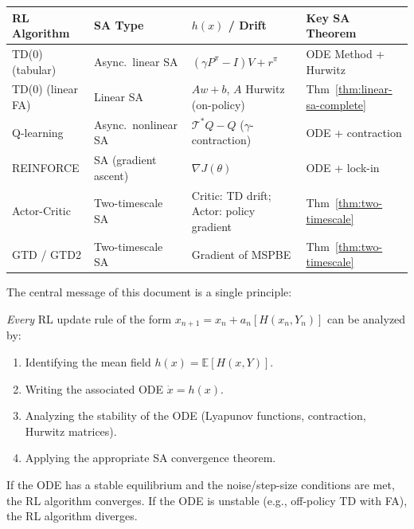 \documentclass[11pt,a4paper]{article}
\theoremstyle{definition}
\theoremstyle{plain}
\theoremstyle{remark}
\newcommand{\E}{\mathbb{E}}
\begin{document}
\begin{center}
\renewcommand{\arraystretch}{1.4}
\begin{tabular}{@{}p{3cm}p{3.5cm}p{3cm}p{3.5cm}@{}}
\toprule
\textbf{RL Algorithm} & \textbf{SA Type} & \textbf{$h(x)$ / Drift} & \textbf{Key SA Theorem} \\
\midrule
TD(0) (tabular) & Async.\ linear SA & $(\gamma P^\pi - I)V + r^\pi$ & ODE Method + Hurwitz \\
\addlinespace
TD(0) (linear FA) & Linear SA & $Aw + b$, $A$ Hurwitz (on-policy) & Thm~\ref{thm:linear-sa-complete} \\
\addlinespace
Q-learning & Async.\ nonlinear SA & $\mathcal{T}^*Q - Q$ ($\gamma$-contraction) & ODE + contraction \\
\addlinespace
REINFORCE & SA (gradient ascent) & $\nabla J(\theta)$ & ODE + lock-in \\
\addlinespace
Actor-Critic & Two-timescale SA & Critic: TD drift; Actor: policy gradient & Thm~\ref{thm:two-timescale} \\
\addlinespace
GTD / GTD2 & Two-timescale SA & Gradient of MSPBE & Thm~\ref{thm:two-timescale} \\
\bottomrule
\end{tabular}
\end{center}

\bigskip
\noindent
The central message of this document is a single principle:

\begin{keyresult}
\emph{Every} RL update rule of the form $x_{n+1} = x_n + a_n[H(x_n, Y_n)]$ can be
analyzed by:
\begin{enumerate}[leftmargin=2em]
\item Identifying the mean field $h(x) = \E[H(x, Y)]$.
\item Writing the associated ODE $\dot{x} = h(x)$.
\item Analyzing the stability of the ODE (Lyapunov functions, contraction,
  Hurwitz matrices).
\item Applying the appropriate SA convergence theorem.
\end{enumerate}
If the ODE has a stable equilibrium and the noise/step-size conditions are met, the
RL algorithm converges. If the ODE is unstable (e.g., off-policy TD with FA), the RL
algorithm diverges.
\end{keyresult}
\end{document}
